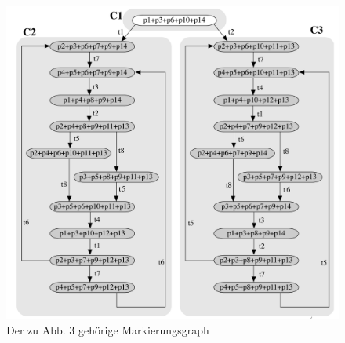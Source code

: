 \documentclass[11pt,onecolumn,a4paper,DIV=calc]{scrartcl}
\begin{document}
\begin{figure}[h]
\center
\includegraphics[scale=0.4]{graph1.PNG}
\caption{Der zu Abb. 3 gehörige Markierungsgraph}
\label{graph}
\end{figure}
\newpage
\end{document}
